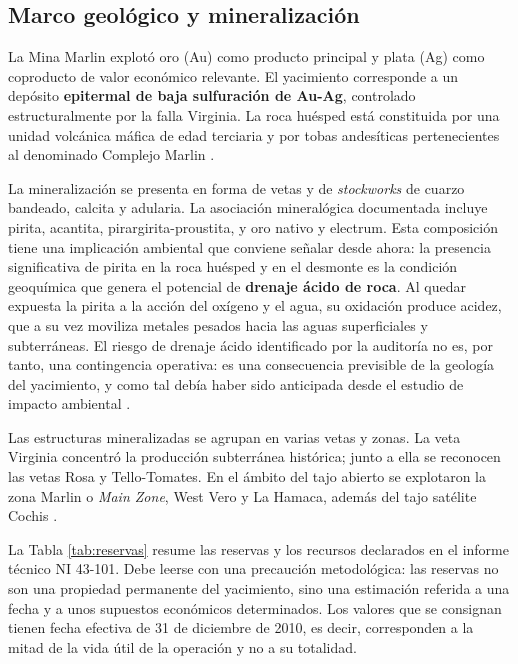 \subsection{Marco geológico y mineralización}

La Mina Marlin explotó oro (Au) como producto principal y plata (Ag) como
coproducto de valor económico relevante. El yacimiento corresponde a un depósito
\textbf{epitermal de baja sulfuración de Au-Ag}, controlado estructuralmente por
la falla Virginia. La roca huésped está constituida por una unidad volcánica
máfica de edad terciaria y por tobas andesíticas pertenecientes al denominado
Complejo Marlin \parencite{sec2011ni43101}.

La mineralización se presenta en forma de vetas y de \textit{stockworks} de cuarzo
bandeado, calcita y adularia. La asociación mineralógica documentada incluye
pirita, acantita, pirargirita-proustita, y oro nativo y electrum. Esta composición
tiene una implicación ambiental que conviene señalar desde ahora: la presencia
significativa de pirita en la roca huésped y en el desmonte es la condición
geoquímica que genera el potencial de \textbf{drenaje ácido de roca}. Al quedar
expuesta la pirita a la acción del oxígeno y el agua, su oxidación produce
acidez, que a su vez moviliza metales pesados hacia las aguas superficiales y
subterráneas. El riesgo de drenaje ácido identificado por la auditoría no es, por
tanto, una contingencia operativa: es una consecuencia previsible de la geología
del yacimiento, y como tal debía haber sido anticipada desde el estudio de
impacto ambiental \parencite{moran2004review}.

Las estructuras mineralizadas se agrupan en varias vetas y zonas. La veta Virginia
concentró la producción subterránea histórica; junto a ella se reconocen las vetas
Rosa y Tello-Tomates. En el ámbito del tajo abierto se explotaron la zona Marlin
o \textit{Main Zone}, West Vero y La Hamaca, además del tajo satélite Cochis
\parencite{sec2011ni43101}.

La Tabla \ref{tab:reservas} resume las reservas y los recursos declarados en el
informe técnico NI 43-101. Debe leerse con una precaución metodológica: las
reservas no son una propiedad permanente del yacimiento, sino una estimación
referida a una fecha y a unos supuestos económicos determinados. Los valores que
se consignan tienen fecha efectiva de 31 de diciembre de 2010, es decir,
corresponden a la mitad de la vida útil de la operación y no a su totalidad.


